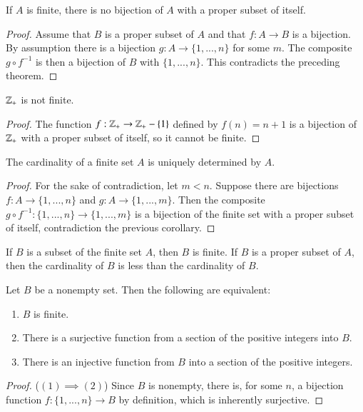 \documentclass[12pt, a4paper, oneside, openright, titlepage]{book}
\begin{document}
\begin{appendices}
    \begin{corollary}
        If $A$ is finite, there is no bijection of $A$ with a proper subset of itself.
    \end{corollary}
    \begin{proof}
        Assume that $B$ is a proper subset of $A$ and that $f:A\rightarrow B$ is a bijection. By assumption there is a bijection $g:A\rightarrow \{1,...,n\}$ for some $m$. The composite $g \circ f^{-1}$ is then a bijection of $B$ with $\{1,...,n\}$. This contradicts the preceding theorem.
    \end{proof}


    \begin{corollary}
        $\mathbb Z_+$ is not finite.
    \end{corollary}
    \begin{proof}
        The function $f:\mathbb Z_+\rightarrow \mathbb Z_+ -\{1\}$ defined by $f(n) = n+1$ is a bijection of $\mathbb Z_+$ with a proper subset of itself, so it cannot be finite.
    \end{proof}


    \begin{corollary}
        The cardinality of a finite set $A$ is uniquely determined by $A$.
    \end{corollary}
    \begin{proof}
        For the sake of contradiction, let $m < n$. Suppose there are bijections $f:A\rightarrow \{1,...,n\}$ and $g:A\rightarrow \{1,...,m\}$. Then the composite $g\circ f^{-1}:\{1,...,n\}\rightarrow \{1,...,m\}$ is a bijection of the finite set with a proper subset of itself, contradiction the previous corollary.
    \end{proof}


    \begin{corollary}
        If $B$ is a subset of the finite set $A$, then $B$ is finite. If $B$ is a proper subset of $A$, then the cardinality of $B$ is less than the cardinality of $B$.
    \end{corollary}
    

    \begin{corollary}
        Let $B$ be a nonempty set. Then the following are equivalent:\begin{enumerate}
            \item $B$ is finite.
            \item There is a surjective function from a section of the positive integers into $B$.
            \item There is an injective function from $B$ into a section of the positive integers.
        \end{enumerate}
    \end{corollary}
    \begin{proof}
        ($(1)\implies (2)$) Since $B$ is nonempty, there is, for some $n$, a bijection function $f:\{1,...,n\}\rightarrow B$ by definition, which is inherently surjective.


\end{proof}
\end{appendices}
\end{document}
